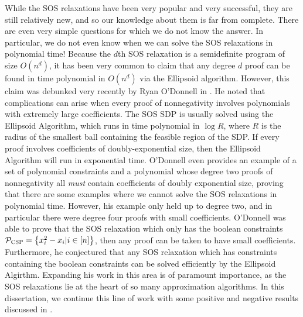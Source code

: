 While the SOS relaxations have been very popular and very successful, they are still relatively new, and so our knowledge about them is far from complete. 
There are even very simple questions for which we do not know the answer.
In particular, we do not even know when we can solve the SOS relaxations in polynomial time! 
Because the $d$th SOS relaxation is a semidefinite program of size $O(n^d)$, it has been very common to claim that any degree $d$ proof can be found in time polynomial in $O(n^d)$ via the Ellipsoid algorithm. However, this claim was debunked very recently by Ryan O'Donnell in \cite{ODon16}. 
He noted that complications can arise when every proof of nonnegativity involves polynomials with extremely large coefficients.
The SOS SDP is usually solved using the Ellipsoid Algorithm, which runs in time polynomial in $\log R$, where $R$ is the radius of the smallest ball containing the feasible region of the SDP. 
If every proof involves coefficients of doubly-exponential size, then the Ellipsoid Algorithm will run in exponential time. 
O'Donnell even provides an example of a set of polynomial constraints and a polynomial whose degree two proofs of nonnegativity all \emph{must} contain coefficients of doubly exponential size, proving that there are some examples where we cannot solve the SOS relaxations in polynomial time.
However, his example only held up to degree two, and in particular there were degree four proofs with small coefficients. 
O'Donnell was able to prove that the SOS relaxation which only has the boolean constraints $\mathcal P_{\textsc{CSP}} = \left\{x_i^2 - x_i | i \in [n]\right\}$, then any proof can be taken to have small coefficients. 
Furthermore, he conjectured that any SOS relaxation which has constraints containing the boolean constraints can be solved efficiently by the Ellipsoid Algirthm.
Expanding his work in this area is of paramount importance, as the SOS relaxations lie at the heart of so many approximation algorithms. 
In this dissertation, we continue this line of work with some positive and negative results discussed in .


